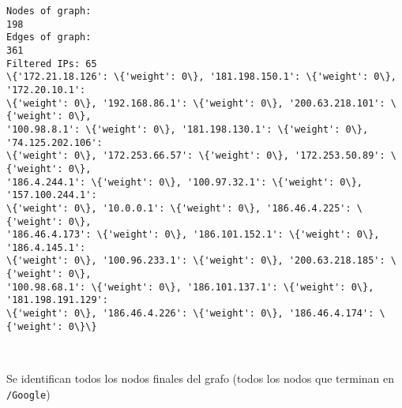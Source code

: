 \documentclass[11pt]{article}
\begin{document}
    \begin{Verbatim}[commandchars=\\\{\}]
Nodes of graph:
198
Edges of graph:
361
Filtered IPs: 65
\{'172.21.18.126': \{'weight': 0\}, '181.198.150.1': \{'weight': 0\}, '172.20.10.1':
\{'weight': 0\}, '192.168.86.1': \{'weight': 0\}, '200.63.218.101': \{'weight': 0\},
'100.98.8.1': \{'weight': 0\}, '181.198.130.1': \{'weight': 0\}, '74.125.202.106':
\{'weight': 0\}, '172.253.66.57': \{'weight': 0\}, '172.253.50.89': \{'weight': 0\},
'186.4.244.1': \{'weight': 0\}, '100.97.32.1': \{'weight': 0\}, '157.100.244.1':
\{'weight': 0\}, '10.0.0.1': \{'weight': 0\}, '186.46.4.225': \{'weight': 0\},
'186.46.4.173': \{'weight': 0\}, '186.101.152.1': \{'weight': 0\}, '186.4.145.1':
\{'weight': 0\}, '100.96.233.1': \{'weight': 0\}, '200.63.218.185': \{'weight': 0\},
'100.98.68.1': \{'weight': 0\}, '186.101.137.1': \{'weight': 0\}, '181.198.191.129':
\{'weight': 0\}, '186.46.4.226': \{'weight': 0\}, '186.46.4.174': \{'weight': 0\}\}
    \end{Verbatim}

    \begin{center}
    \end{center}
    { \hspace*{\fill} \\}
    
    Se identifican todos los nodos finales del grafo (todos los nodos que
terminan en \texttt{/Google})
\end{document}
